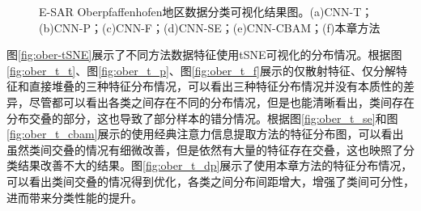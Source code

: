\begin{figure}[ht!]

    \caption{E-SAR Oberpfaffenhofen地区数据分类可视化结果图。(a)CNN-T；(b)CNN-P；(c)CNN-F；(d)CNN-SE；(e)CNN-CBAM；(f)本章方法}
    \label{fig:ober_res}
\end{figure}

图\ref{fig:ober-tSNE}展示了不同方法数据特征使用tSNE可视化的分布情况。根据图\ref{fig:ober_t_t}、图\ref{fig:ober_t_p}、图\ref{fig:ober_t_f}展示的仅散射特征、仅分解特征和直接堆叠的三种特征分布情况，可以看出三种特征分布情况并没有本质性的差异，尽管都可以看出各类之间存在不同的分布情况，但是也能清晰看出，类间存在分布交叠的部分，这也导致了部分样本的错分情况。根据图\ref{fig:ober_t_se}和图\ref{fig:ober_t_cbam}展示的使用经典注意力信息提取方法的特征分布图，可以看出虽然类间交叠的情况有细微改善，但是依然有大量的特征存在交叠，这也映照了分类结果改善不大的结果。图\ref{fig:ober_t_dp}展示了使用本章方法的特征分布情况，可以看出类间交叠的情况得到优化，各类之间分布间距增大，增强了类间可分性，进而带来分类性能的提升。

